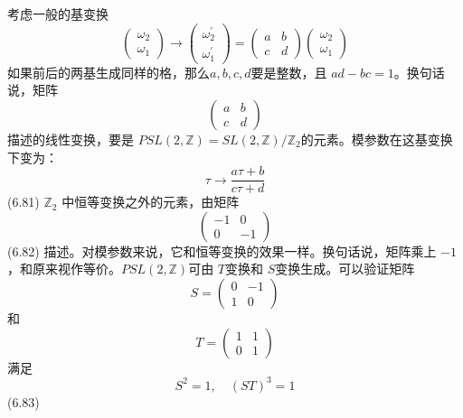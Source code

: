 考虑一般的基变换
\begin{equation}
	\left(\begin{array}{l} \omega_{2} \\ \omega_{1} \end{array}\right) \rightarrow\left(\begin{array}{l} \omega_{2}^{\prime} \\ \omega_{1}^{\prime} \end{array}\right)=\left(\begin{array}{ll} a & b \\ c & d \end{array}\right)\left(\begin{array}{l} \omega_{2} \\ \omega_{1} \end{array}\right)
\end{equation}
如果前后的两基生成同样的格，那么$ a,b,c,d $要是整数，且 $a d-b c=1 $。换句话说，矩阵
\begin{equation}
	\left(\begin{array}{ll} a & b \\ c & d \end{array}\right) 
\end{equation}
描述的线性变换，要是 $P S L(2, \mathbb{Z})=S L(2, \mathbb{Z}) / \mathbb{Z}_{2} $的元素。模参数在这基变换下变为：
\begin{equation}
	\tau \rightarrow \frac{a \tau+b}{c \tau+d} 
\end{equation}\quad \quad (6.81)
$\mathbb{Z}_2$ 中恒等变换之外的元素，由矩阵
\begin{equation}
	\left(\begin{array}{cc} -1 & 0 \\ 0 & -1 \end{array}\right) 
\end{equation}\quad \quad (6.82)
描述。对模参数来说，它和恒等变换的效果一样。换句话说，矩阵乘上 $-1 $，和原来视作等价。$ P S L(2, \mathbb{Z}) $可由 $T $变换和 $S $变换生成。可以验证矩阵
$$
S=\left(\begin{array}{ll} 0 & -1 \\ 1 & 0 \end{array}\right)
$$
和
$$
T=\left(\begin{array}{ll} 1 & 1 \\ 0 & 1 \end{array}\right)
$$
满足
\begin{equation}
	S^{2}=1, \quad(S T)^{3}=1
\end{equation} \quad \quad (6.83)

